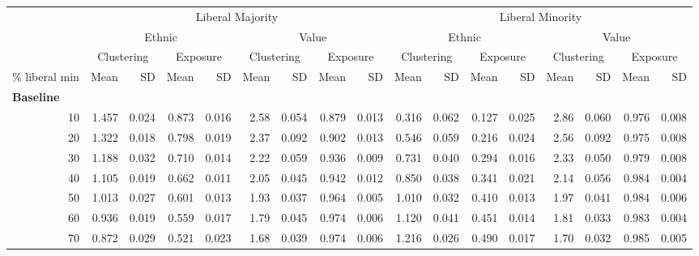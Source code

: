 \documentclass[
]{article}
\begin{document}
\begin{table}[H]
\begin{table}
{\begin{tabular}{r|r|r|r|r|r|r|r|r|r|r|r|r|r|r|r|r}
\hline
\multicolumn{1}{c|}{ } & \multicolumn{8}{c|}{Liberal Majority} & \multicolumn{8}{c}{Liberal Minority} \\
\cline{2-9} \cline{10-17}
\multicolumn{1}{c|}{ } & \multicolumn{4}{c|}{Ethnic} & \multicolumn{4}{c|}{Value} & \multicolumn{4}{c|}{Ethnic} & \multicolumn{4}{c}{Value} \\
\cline{2-5} \cline{6-9} \cline{10-13} \cline{14-17}
\multicolumn{1}{c|}{ } & \multicolumn{2}{c|}{Clustering} & \multicolumn{2}{c|}{Exposure} & \multicolumn{2}{c|}{Clustering} & \multicolumn{2}{c|}{Exposure} & \multicolumn{2}{c|}{Clustering} & \multicolumn{2}{c|}{Exposure} & \multicolumn{2}{c|}{Clustering} & \multicolumn{2}{c}{Exposure} \\
\cline{2-3} \cline{4-5} \cline{6-7} \cline{8-9} \cline{10-11} \cline{12-13} \cline{14-15} \cline{16-17}
\% liberal min & Mean & SD & Mean & SD & Mean & SD & Mean & SD & Mean & SD & Mean & SD & Mean & SD & Mean & SD\\
\hline
\multicolumn{17}{l}{\textbf{Baseline}}\\
\hline
\hspace{1em}10 & 1.457 & 0.024 & 0.873 & 0.016 & 2.58 & 0.054 & 0.879 & 0.013 & 0.316 & 0.062 & 0.127 & 0.025 & 2.86 & 0.060 & 0.976 & 0.008\\
\hline
\hspace{1em}20 & 1.322 & 0.018 & 0.798 & 0.019 & 2.37 & 0.092 & 0.902 & 0.013 & 0.546 & 0.059 & 0.216 & 0.024 & 2.56 & 0.092 & 0.975 & 0.008\\
\hline
\hspace{1em}30 & 1.188 & 0.032 & 0.710 & 0.014 & 2.22 & 0.059 & 0.936 & 0.009 & 0.731 & 0.040 & 0.294 & 0.016 & 2.33 & 0.050 & 0.979 & 0.008\\
\hline
\hspace{1em}40 & 1.105 & 0.019 & 0.662 & 0.011 & 2.05 & 0.045 & 0.942 & 0.012 & 0.850 & 0.038 & 0.341 & 0.021 & 2.14 & 0.056 & 0.984 & 0.004\\
\hline
\hspace{1em}50 & 1.013 & 0.027 & 0.601 & 0.013 & 1.93 & 0.037 & 0.964 & 0.005 & 1.010 & 0.032 & 0.410 & 0.013 & 1.97 & 0.041 & 0.984 & 0.006\\
\hline
\hspace{1em}60 & 0.936 & 0.019 & 0.559 & 0.017 & 1.79 & 0.045 & 0.974 & 0.006 & 1.120 & 0.041 & 0.451 & 0.014 & 1.81 & 0.033 & 0.983 & 0.004\\
\hline
\hspace{1em}70 & 0.872 & 0.029 & 0.521 & 0.023 & 1.68 & 0.039 & 0.974 & 0.006 & 1.216 & 0.026 & 0.490 & 0.017 & 1.70 & 0.032 & 0.985 & 0.005\\

\end{tabular}}
\end{table}
\end{table}
\end{document}

